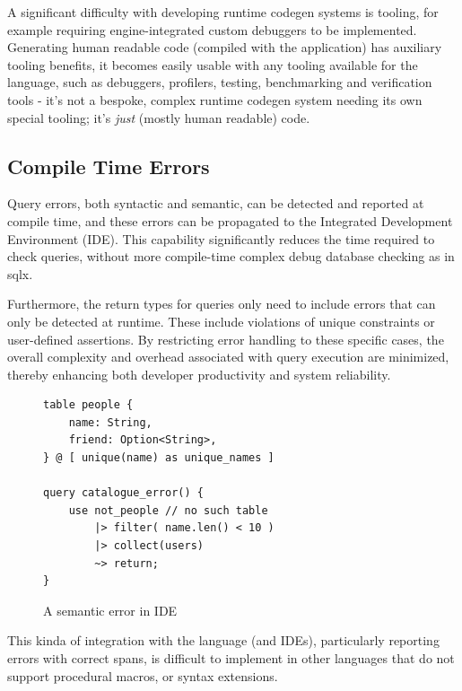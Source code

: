 \documentclass[conference]{IEEEtran}
\begin{document}
A significant difficulty with developing runtime codegen systems is tooling, for example requiring engine-integrated custom debuggers to be implemented.\cite{PracticalCodegen}
Generating human readable code (compiled with the application) has auxiliary tooling benefits, it becomes easily usable with any tooling
available for the language, such as debuggers, profilers, testing, benchmarking and verification tools -
it's not a bespoke, complex runtime codegen system needing its own special tooling; it's \textit{just} (mostly human readable) code.

\subsection{Compile Time Errors}

Query errors, both syntactic and semantic, can be detected and reported at compile time, and these errors
can be propagated to the Integrated Development Environment (IDE). This capability significantly reduces
the time required to check queries, without more compile-time complex debug database checking as in sqlx.

Furthermore, the return types for queries only need to include errors that can only be detected
at runtime. These include violations of unique constraints or user-defined assertions. By restricting
error handling to these specific cases, the overall complexity and overhead associated with query
execution are minimized, thereby enhancing both developer productivity and system reliability.

\begin{figure}[h]
    \begin{verbatim}
table people {
    name: String,
    friend: Option<String>,
} @ [ unique(name) as unique_names ]

query catalogue_error() {
    use not_people // no such table
        |> filter( name.len() < 10 ) 
        |> collect(users) 
        ~> return;
}
    \end{verbatim}
    \caption{A semantic error in IDE}
    \label{fig:query-error}
\end{figure}

This kinda of integration with the language (and IDEs), particularly reporting
errors with correct spans, is difficult to implement in other languages that do
not support procedural macros, or syntax extensions.
\end{document}
